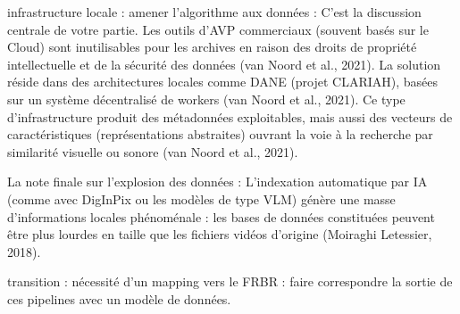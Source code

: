 infrastructure locale : amener l'algorithme aux données : C'est la discussion centrale de votre partie. Les outils d'AVP commerciaux (souvent basés sur le Cloud) sont inutilisables pour les archives en raison des droits de propriété intellectuelle et de la sécurité des données (van Noord et al., 2021). La solution réside dans des architectures locales comme DANE (projet CLARIAH), basées sur un système décentralisé de workers (van Noord et al., 2021). Ce type d'infrastructure produit des métadonnées exploitables, mais aussi des vecteurs de caractéristiques (représentations abstraites) ouvrant la voie à la recherche par similarité visuelle ou sonore (van Noord et al., 2021).

La note finale sur l'explosion des données : L'indexation automatique par IA (comme avec DigInPix ou les modèles de type VLM) génère une masse d'informations locales phénoménale : les bases de données constituées peuvent être plus lourdes en taille que les fichiers vidéos d'origine (Moiraghi  Letessier, 2018).

transition : nécessité d'un mapping vers le FRBR : faire correspondre la sortie de ces pipelines avec un modèle de données. 